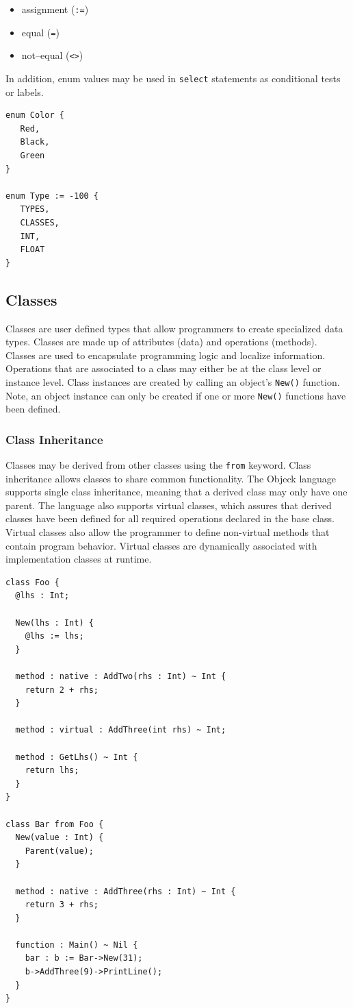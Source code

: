 \documentclass[11pt]{article}
\begin{document}
\begin{itemize}
\item assignment (\texttt{:=})
\item equal (\texttt{=})
\item not--equal (\texttt{<>})
\end{itemize}

In addition, enum values may be used in \texttt{select} statements as
conditional tests or labels.

\begin{verbatim}
enum Color {
   Red,
   Black,
   Green
}

enum Type := -100 {
   TYPES,
   CLASSES,
   INT,
   FLOAT
}
\end{verbatim}

\subsection{Classes}
Classes are user defined types that allow programmers to create
specialized data types.  Classes are made up of attributes (data) and
operations (methods).  Classes are used to encapsulate programming
logic and localize information.  Operations that are associated to a
class may either be at the class level or instance level.  Class
instances are created by calling an object's \texttt{New()} function.
Note, an object instance can only be created if one or more
\texttt{New()} functions have been defined.

\subsubsection{Class Inheritance}
Classes may be derived from other classes using the \texttt{from}
keyword.  Class inheritance allows classes to share common
functionality.  The Objeck language supports single class inheritance,
meaning that a derived class may only have one parent.  The language
also supports virtual classes, which assures that derived classes have
been defined for all required operations declared in the base class.
Virtual classes also allow the programmer to define non-virtual
methods that contain program behavior.  Virtual classes are
dynamically associated with implementation classes at runtime.
\begin{verbatim}
class Foo {
  @lhs : Int;

  New(lhs : Int) {
    @lhs := lhs;
  }

  method : native : AddTwo(rhs : Int) ~ Int {
    return 2 + rhs;
  }

  method : virtual : AddThree(int rhs) ~ Int;

  method : GetLhs() ~ Int {
    return lhs;
  }
}

class Bar from Foo {
  New(value : Int) {
    Parent(value);
  }

  method : native : AddThree(rhs : Int) ~ Int {
    return 3 + rhs;
  }

  function : Main() ~ Nil {
    bar : b := Bar->New(31);
    b->AddThree(9)->PrintLine();
  }
}
\end{verbatim}
\end{document}
